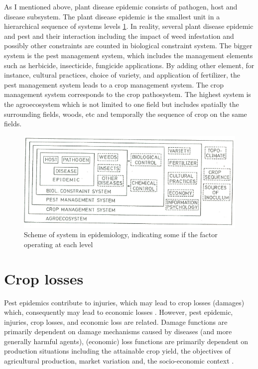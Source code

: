 As I mentioned above, plant disease epidemic consists of pathogen, host and disease subsystem. The plant disease epidemic is the smallest unit in a hierarchical sequence of systems levels \ref{fig:system_level}.  In reality,  several plant disease epidemic and pest and their interaction including the impact of weed infestation and possibly other constraints are counted in biological constraint system. The bigger system is the pest management system, which includes the management elements such as herbicide, insecticide, fungicide applications. By adding other element, for instance, cultural practices, choice of variety, and application of fertilizer, the pest management system leads to a crop management system. The crop management system corresponds to the crop pathosystem. The highest system is the agroecosystem which is not limited to one field but includes spatially the surrounding fields, woods, etc and temporally the sequence of crop on the same fields.

\begin{figure}
\includegraphics[width=12cm]{system_level}
\centering
\caption{Scheme of system in epidemiology, indicating some if the factor operating at each level \cite{kranz1980systems}}
\label{fig:system_level}
\end{figure}

\section*{Crop losses}
Pest epidemics contribute to injuries, which may lead to crop losses (damages) which, consequently may lead to economic losses \citep{Zadok1985}. However, pest epidemic, injuries, crop losses, and economic loss are related. Damage functions are primarily dependent on damage mechanisms caused by diseases (and more generally harmful agents), (economic) loss functions \citep{Zadok1985} are primarily dependent on production situations including the attainable crop yield, the objectives of agricultural production, market variation and, the socio-economic context \citep{Savary:2006to}.

